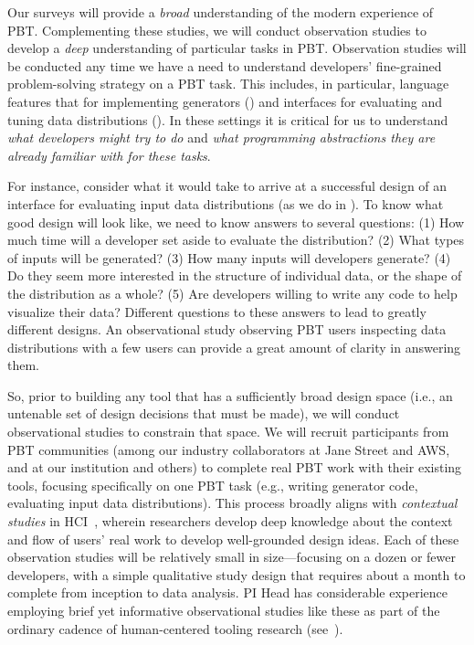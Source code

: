 %
Our surveys will provide a {\em broad} understanding of
the modern experience of PBT. Complementing these studies, we will conduct
observation studies to develop a \emph{deep} understanding of particular tasks
in PBT. Observation studies will be conducted any time we have a need to
understand developers' fine-grained problem-solving strategy on a PBT task.
This includes, in particular, language features that for implementing
generators () and interfaces for evaluating and tuning data
distributions (). In these settings it is critical
for us to understand \emph{what developers might try to do} and \emph{what
programming abstractions they are already familiar with for these tasks}.

For instance, consider what it would take to arrive at a successful design of
an interface for evaluating input data distributions (as we do in
). To know what good design will look like, we need to know
answers to several questions: (1) How much time will a developer set aside to
evaluate the distribution? (2) What types of inputs will be generated? (3) How
many inputs will developers generate? (4) Do they seem more interested in
the structure of individual data, or the shape of the
distribution as a whole? (5) Are developers willing to write any code to
help visualize their data? Different questions to these answers to lead to
greatly different designs. An observational study observing PBT users
inspecting data distributions with a few users can provide a great amount of
clarity in answering them.

So, prior to building any tool that has a sufficiently broad design space (i.e., an
untenable set of design decisions that must be made), we will conduct
observational studies to constrain that space. We will recruit participants
from PBT communities (among our industry collaborators at Jane Street and AWS,
and at our institution and others) to complete real PBT work with their
existing tools, focusing specifically on one PBT task (e.g., writing generator
code, evaluating input data distributions). This process broadly aligns with
\emph{contextual studies} in HCI~\cite[Chapter
3]{ref:holtzblatt1997contextual}, wherein researchers develop deep
knowledge about the context and flow of users' real work to develop well-grounded design
ideas.  Each of these observation studies will be relatively small in
size---focusing on a dozen or fewer developers, with a simple qualitative study
design that requires about a month to complete from inception to data analysis.
PI Head has considerable experience employing brief yet informative
observational studies like these as part of the ordinary cadence of
human-centered tooling research
(see~\cite{ref:fok2023scim,ref:august2022paper,ref:head2021augmenting,ref:head2018interactive}).

